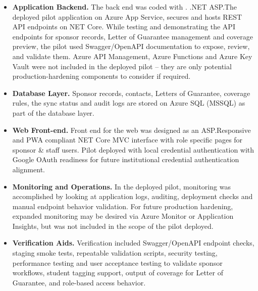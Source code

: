     \begin{itemize}
        \item \textbf{Application Backend.} The back end was coded with . .NET ASP.The deployed pilot application on Azure App Service, secures and hosts REST API endpoints on NET Core. While testing and demonstrating the API endpoints for sponsor records, Letter of Guarantee management and coverage preview, the pilot used Swagger/OpenAPI documentation to expose, review, and validate them. Azure API Management, Azure Functions and Azure Key Vault were not included in the deployed pilot – they are only potential production-hardening components to consider if required.
    
        \item \textbf{Database Layer.} Sponsor records, contacts, Letters of Guarantee, coverage rules, the sync status and audit logs are stored on Azure SQL (MSSQL) as part of the database layer.
    
        \item \textbf{Web Front-end.} Front end for the web was designed as an ASP.Responsive and PWA compliant NET Core MVC interface with role specific pages for sponsor \& staff users. Pilot deployed with local credential authentication with Google OAuth readiness for future institutional credential authentication alignment.
    
        \item \textbf{Monitoring and Operations.} In the deployed pilot, monitoring was accomplished by looking at application logs, auditing, deployment checks and manual endpoint behavior validation. For future production hardening, expanded monitoring may be desired via Azure Monitor or Application Insights, but was not included in the scope of the pilot deployed.
    
        \item \textbf{Verification Aids.} Verification included Swagger/OpenAPI endpoint checks, staging smoke tests, repeatable validation scripts, security testing, performance testing and user acceptance testing to validate sponsor workflows, student tagging support, output of coverage for Letter of Guarantee, and role-based access behavior.
    \end{itemize}

    

